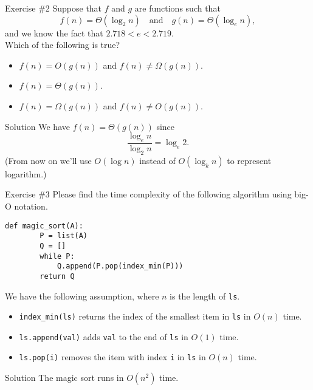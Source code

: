 \documentclass{beamer}
\begin{document}
\begin{frame}{Exercise \#2}
  Suppose that $f$ and $g$ are functions such that
  \begin{equation*}
    f(n) = \Theta(\log_2 n)
    \quad \text{and} \quad
    g(n) = \Theta(\log_e n),
  \end{equation*}
  and we know the fact that $2.718 < e < 2.719$. \\[.5em] \pause
  Which of the following is true? \pause
  \begin{itemize}
    \item $f(n) = O(g(n))$ and $f(n) \neq \Omega(g(n))$. \pause
    \item $f(n) = \Theta(g(n))$. \pause
    \item $f(n) = \Omega(g(n))$ and $f(n) \neq O(g(n))$. \pause
  \end{itemize}
  \begin{block}{Solution}
    \small
    We have $f(n) = \Theta(g(n))$ since
    \begin{equation*}
      \frac{\log_e n}{\log_2 n} = \log_e 2.
    \end{equation*}
    (From now on we'll use $O(\log n)$ instead of $O(\log_k n)$ to represent
    logarithm.)
  \end{block}
\end{frame}

\begin{frame}[fragile]{Exercise \#3}
  Please find the time complexity of the following algorithm using big-O
  notation. \pause
  \begin{block}{}
    \scriptsize
    \begin{lstlisting}[gobble=4]
    def magic_sort(A):
        P = list(A)
        Q = []
        while P:
            Q.append(P.pop(index_min(P)))
        return Q
    \end{lstlisting}
    \pause
  \end{block}
  We have the following assumption, where $n$ is the length of \lstinline{ls}.
  \pause
  \begin{itemize}
    \item \lstinline{index_min(ls)} returns the index of the smallest item in
    \lstinline{ls} in $O(n)$ time. \pause
    \item \lstinline{ls.append(val)} adds \lstinline{val} to the end of
    \lstinline{ls} in $O(1)$ time. \pause
    \item \lstinline{ls.pop(i)} removes the item with index \lstinline{i}
    in \lstinline{ls} in $O(n)$ time. \pause
  \end{itemize}
  \begin{block}{Solution}
    The magic sort runs in $O(n^2)$ time.
  \end{block}
\end{frame}
\end{document}
